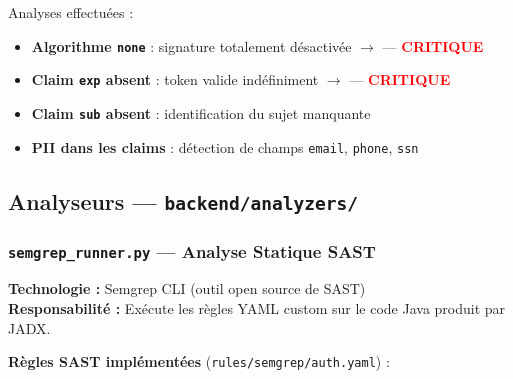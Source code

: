 \documentclass[12pt,a4paper,french]{article}
\newcommand{\file}[1]{\textcolor{primary}{\texttt{#1}}}
\newcommand{\critical}[1]{\textcolor{red}{\textbf{#1}}}
\begin{document}
Analyses effectuées :

\begin{itemize}[leftmargin=1.5cm]
  \item \textbf{Algorithme \texttt{none}} : signature totalement désactivée
    $\rightarrow$  — \critical{CRITIQUE}
  \item \textbf{Claim \texttt{exp} absent} : token valide indéfiniment
    $\rightarrow$  — \critical{CRITIQUE}
  \item \textbf{Claim \texttt{sub} absent} : identification du sujet manquante
  \item \textbf{PII dans les claims} : détection de champs \texttt{email}, \texttt{phone}, \texttt{ssn}
\end{itemize}

\subsection{Analyseurs — \file{backend/analyzers/}}

\subsubsection{\file{semgrep\_runner.py} — Analyse Statique SAST}

\begin{tcolorbox}[toolbox, title={Rôle : Détection de patterns de sécurité dans le code Java/Kotlin décompilé}]
\textbf{Technologie :} Semgrep CLI (outil open source de SAST)\\
\textbf{Responsabilité :} Exécute les règles YAML custom sur le code Java produit par JADX.
\end{tcolorbox}

\textbf{Règles SAST implémentées} (\file{rules/semgrep/auth.yaml}) :
\end{document}
